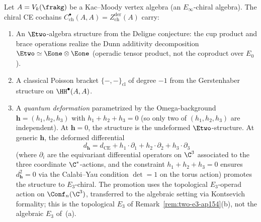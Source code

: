 \begin{construction}
\label{constr:quantum-ce-deformation}
Let $A = V_k(\frakg)$ be a Kac--Moody vertex algebra (an $E_\infty$-chiral algebra). The chiral CE cochains $C^\bullet_{\mathrm{ch}}(A, A) = Z^{\mathrm{der}}_{\mathrm{ch}}(A)$ carry:
\begin{enumerate}[label=\textup{(\roman*)}]
 \item An $\Etwo$-algebra structure from the Deligne conjecture: the cup product and brace operations realize the Dunn additivity decomposition $\Etwo \simeq \Eone \otimes \Eone$ (operadic tensor product, not the coproduct over $E_0$).
 \item A classical Poisson bracket $\{-, -\}_{\mathrm{cl}}$ of degree $-1$ from the Gerstenhaber structure on $\HH^\bullet(A, A)$.
 \item A \emph{quantum deformation} parametrized by the Omega-background $\boldsymbol{h} = (h_1, h_2, h_3)$ with $h_1 + h_2 + h_3 = 0$ (so only two of $(h_1, h_2, h_3)$ are independent). At $\boldsymbol{h} = 0$, the structure is the undeformed $\Etwo$-structure. At generic $\boldsymbol{h}$, the deformed differential
 \[
 d_{\boldsymbol{h}} = d_{\mathrm{CE}} + h_1 \cdot \partial_1 + h_2 \cdot \partial_2 + h_3 \cdot \partial_3
 \]
 (where $\partial_i$ are the equivariant differential operators on $\C^3$ associated to the three coordinate $\C^*$-actions, and the constraint $h_1 + h_2 + h_3 = 0$ ensures $d_{\boldsymbol{h}}^2 = 0$ via the Calabi--Yau condition $\det = 1$ on the torus action) promotes the structure to $E_3$-chiral. The promotion uses the topological $E_3$-operad action on $\Conf_n(\C^3)$, transferred to the algebraic setting via Kontsevich formality; this is the topological $E_3$ of Remark~\ref{rem:two-e3-ap154}(b), not the algebraic $E_3$ of~(a).
\end{enumerate}
\end{construction}

